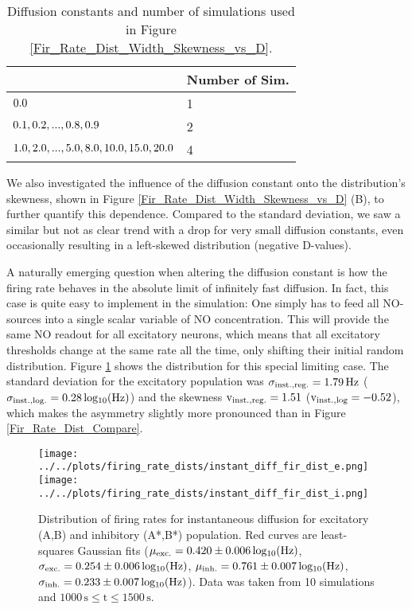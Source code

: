 \documentclass[10pt,a4paper]{article}
\begin{document}
\begin{table}[h]
\caption{Diffusion constants and number of simulations used in Figure \ref{Fir_Rate_Dist_Width_Skewness_vs_D}.}
\begin{center}
\begin{tabu}{|l|l|}
\hline
{} & \textbf{Number of Sim.} \\ \hline
$\rm 0.0$ & 1 \\ \hline
$\rm 0.1,0.2,...,0.8,0.9$ & 2 \\ \hline
$\rm 1.0,2.0,...,5.0,8.0,10.0,15.0,20.0$ & 4 \\ \hline
\end{tabu}
\end{center}
\label{Diff_Test_Constants_Sim_Number}
\end{table}

We also investigated the influence of the diffusion constant onto the distribution's skewness, shown in Figure \ref{Fir_Rate_Dist_Width_Skewness_vs_D} (B), to further quantify this dependence. Compared to the standard deviation, we saw a similar but not as clear trend with a drop for very small diffusion constants, even occasionally resulting in a left-skewed distribution (negative D-values).

A naturally emerging question when altering the diffusion constant is how the firing rate behaves in the absolute limit of infinitely fast diffusion. In fact, this case is quite easy to implement in the simulation: One simply has to feed all NO-sources into a single scalar variable of NO concentration. This will provide the same NO readout for all excitatory neurons, which means that all excitatory thresholds change at the same rate all the time, only shifting their initial random distribution. Figure \ref{Fir_Rate_Dist_Instant_compare} shows the distribution for this special limiting case. The standard deviation for the excitatory population was $\mathrm{\sigma_{\rm inst.,reg.} = 1.79\, Hz}$ ($\mathrm{\sigma_{\rm inst.,log.} = 0.28\, log_{10}(Hz)}$) and the skewness $\mathrm{v_{\rm inst.,reg.} = 1.51}$ ($\mathrm{v_{\rm inst.,log} = -0.52}$), which makes the asymmetry slightly more pronounced than in Figure \ref{Fir_Rate_Dist_Compare}.  
\begin{figure}
\texttt{[image: ../../plots/firing\_rate\_dists/instant\_diff\_fir\_dist\_e.png]}
\texttt{[image: ../../plots/firing\_rate\_dists/instant\_diff\_fir\_dist\_i.png]}
\caption[Distribution of firing rates for instantaneous diffusion]{Distribution of firing rates for instantaneous diffusion for excitatory (A,B) and inhibitory (A*,B*) population. Red curves are least-squares Gaussian fits ($\mu_{\rm exc.} = \rm 0.420 \pm  0.006\, log_{10}(Hz)$, $\sigma_{\rm exc.} = \rm 0.254 \pm  0.006\, log_{10}(Hz)$, $\mu_{\rm inh.} = \rm 0.761 \pm  0.007\, log_{10}(Hz)$, $\sigma_{\rm inh.} = \rm 0.233 \pm  0.007\, log_{10}(Hz)$). Data was taken from 10 simulations and $\mathrm{1000\,s \leq t \leq 1500\,s}$.}
\label{Fir_Rate_Dist_Instant_compare}
\end{figure}
\end{document}
